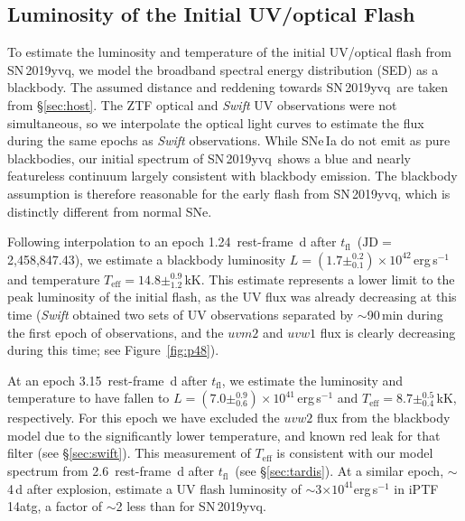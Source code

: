 \documentclass[twocolumn]{aastex63}
\newcommand{\fromkate}[1]{{\color{brown} fromKM: {#1}}}
\newcommand{\tfl}{$t_\mathrm{fl}$}
\newcommand{\sn}{SN\,2019yvq}
\begin{document}

\subsection{Luminosity of the Initial UV/optical Flash}\label{sec:luminosity}

To estimate the luminosity and temperature of the initial UV/optical flash
from \sn, we model the broadband spectral energy distribution (SED) as a
blackbody. The assumed distance and reddening towards \sn\ are taken from
\S\ref{sec:host}. The ZTF optical and \textit{Swift} UV observations were not
simultaneous, so we interpolate the optical light curves to estimate the flux
during the same epochs as \textit{Swift} observations. While SNe\,Ia do not
emit as pure blackbodies, our initial spectrum of \sn\ shows a blue and nearly
featureless continuum largely consistent with blackbody emission. The
blackbody assumption is therefore reasonable for the early flash from \sn,
which is distinctly different from normal SNe.

Following interpolation to an epoch 1.24~rest-frame~d after \tfl\
($\mathrm{JD} = $2,458,847.43), we estimate a blackbody luminosity $L = (1.7
\pm ^{0.2}_{0.1}) \times 10^{42}$\,erg\,s$^{-1}$ and temperature
$T_\mathrm{eff} = 14.8 \pm^{0.9}_{1.2}$\,kK. This estimate represents a lower
limit to the peak luminosity of the initial flash, as the UV flux was already
decreasing at this time (\textit{Swift} obtained two sets of UV observations
separated by $\sim$90\,min during the first epoch of observations, and the
$uvm2$ and $uvw1$ flux is clearly decreasing during this time; see
Figure~\ref{fig:p48}). 

At an epoch 3.15~rest-frame~d after \tfl, we estimate the luminosity and
temperature to have fallen to $L = (7.0 \pm ^{0.9}_{0.6}) \times
10^{41}$\,erg\,s$^{-1}$ and $T_\mathrm{eff} = 8.7 \pm^{0.5}_{0.4}$\,kK,
respectively. For this epoch we have excluded the $uvw2$ flux from the
blackbody model due to the significantly lower temperature, and known red leak
for that filter (see \S\ref{sec:swift}). This measurement of $T_\mathrm{eff}$
is consistent with our model spectrum from 2.6~rest-frame~d after \tfl\ (see
\S\ref{sec:tardis}). At a similar epoch, $\sim$4\,d after explosion,
\citet{Cao15} estimate a UV flash luminosity of $\sim$3$ \times
10^{41}$erg\,s$^{-1}$ in iPTF\,14atg, a factor of $\sim$2 less than for \sn.
\end{document}
